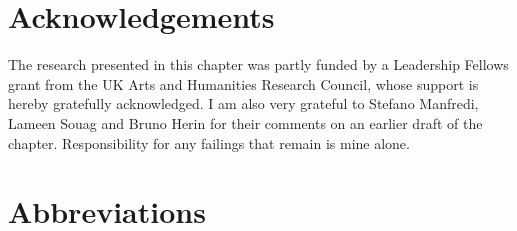 \documentclass[output=paper]{langsci/langscibook}
\begin{document}
\section*{Acknowledgements}

The research presented in this chapter was partly funded by a Leadership Fellows grant from the UK Arts and Humanities Research Council, whose support is hereby gratefully acknowledged. I am also very grateful to Stefano Manfredi, Lameen Souag and Bruno Herin for their comments on an earlier draft of the chapter. Responsibility for any failings that remain is mine alone.

\section*{Abbreviations}
\end{document}
